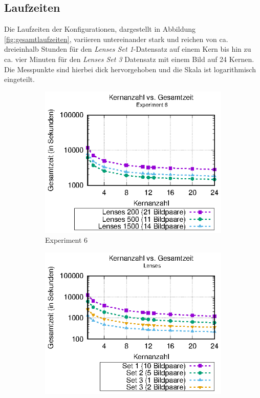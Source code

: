 \subsection{Laufzeiten}

Die Laufzeiten der Konfigurationen, dargestellt in Abbildung \ref{fig:gesamtlaufzeiten}, variieren untereinander stark und reichen von ca. dreieinhalb Stunden für den \textit{Lenses Set 1}-Datensatz auf einem Kern bis hin zu ca. vier Minuten für den \textit{Lenses Set 3} Datensatz mit einem Bild auf 24 Kernen. Die Messpunkte sind hierbei dick hervorgehoben und die Skala ist logarithmisch eingeteilt. 

\begin{center}
	\begin{figure}
		\begin{subfigure}[b]{0.49\textwidth}
			\centering
			\includegraphics[width=\textwidth]{pdf/times_exp6}
			\caption[Experiment 6]{Experiment 6}
			\label{fig:times_exp6}
		\end{subfigure}
		\hfill
		\begin{subfigure}[b]{0.49\textwidth}
			\centering
			\includegraphics[width=\textwidth]{pdf/times_lenses}

\end{subfigure}
\end{figure}
\end{center}

